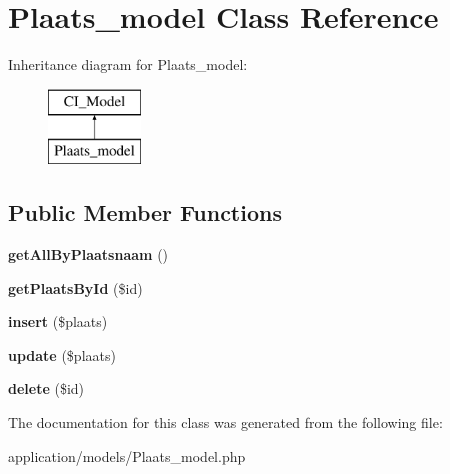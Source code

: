 \hypertarget{class_plaats__model}{}\section{Plaats\+\_\+model Class Reference}
\label{class_plaats__model}
Inheritance diagram for Plaats\+\_\+model\+:\begin{figure}[H]
\begin{center}
\leavevmode
\includegraphics[height=2.000000cm]{class_plaats__model}
\end{center}
\end{figure}
\subsection*{Public Member Functions}
\begin{DoxyCompactItemize}
\item 
\mbox{\label{class_plaats__model_a114ba0a4348ec4fb01b91fd2ae7f4ace}} 
{\bfseries get\+All\+By\+Plaatsnaam} ()
\item 
\mbox{\label{class_plaats__model_a661d0b6b5be192049f4c0dc767b1724e}} 
{\bfseries get\+Plaats\+By\+Id} (\$id)
\item 
\mbox{\label{class_plaats__model_a155f3c7004671ee2918823307c6adf74}} 
{\bfseries insert} (\$plaats)
\item 
\mbox{\label{class_plaats__model_a7fc1a115f2b5bf6d11895a2cff35d83a}} 
{\bfseries update} (\$plaats)
\item 
\mbox{\label{class_plaats__model_a2f8258add505482d7f00ea26493a5723}} 
{\bfseries delete} (\$id)
\end{DoxyCompactItemize}


The documentation for this class was generated from the following file\+:\begin{DoxyCompactItemize}
\item 
application/models/Plaats\+\_\+model.\+php\end{DoxyCompactItemize}
